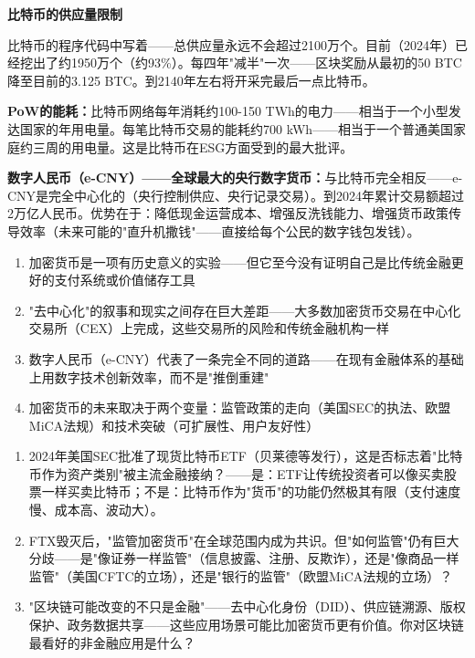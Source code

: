 \documentclass[a4paper,11pt]{ctexbook}
\begin{document}
\begin{quantitative}
\textbf{比特币的供应量限制}

比特币的程序代码中写着——总供应量永远不会超过2100万个。目前（2024年）已经挖出了约1950万个（约93\%）。每四年"减半"一次——区块奖励从最初的50 BTC降至目前的3.125 BTC。到2140年左右将开采完最后一点比特币。

\textbf{PoW的能耗：}比特币网络每年消耗约100-150 TWh的电力——相当于一个小型发达国家的年用电量。每笔比特币交易的能耗约700 kWh——相当于一个普通美国家庭约三周的用电量。这是比特币在ESG方面受到的最大批评。

\textbf{数字人民币（e-CNY）——全球最大的央行数字货币：}与比特币完全相反——e-CNY是完全中心化的（央行控制供应、央行记录交易）。到2024年累计交易额超过2万亿人民币。优势在于：降低现金运营成本、增强反洗钱能力、增强货币政策传导效率（未来可能的"直升机撒钱"——直接给每个公民的数字钱包发钱）。
\end{quantitative}

\begin{lessonsummary}
\begin{enumerate}
  \item 加密货币是一项有历史意义的实验——但它至今没有证明自己是比传统金融更好的支付系统或价值储存工具
  \item "去中心化"的叙事和现实之间存在巨大差距——大多数加密货币交易在中心化交易所（CEX）上完成，这些交易所的风险和传统金融机构一样
  \item 数字人民币（e-CNY）代表了一条完全不同的道路——在现有金融体系的基础上用数字技术创新效率，而不是"推倒重建"
  \item 加密货币的未来取决于两个变量：监管政策的走向（美国SEC的执法、欧盟MiCA法规）和技术突破（可扩展性、用户友好性）
\end{enumerate}
\end{lessonsummary}

\begin{discuss}
\begin{enumerate}
  \item 2024年美国SEC批准了现货比特币ETF（贝莱德等发行），这是否标志着"比特币作为资产类别"被主流金融接纳？——是：ETF让传统投资者可以像买卖股票一样买卖比特币；不是：比特币作为"货币"的功能仍然极其有限（支付速度慢、成本高、波动大）。
  \item FTX毁灭后，"监管加密货币"在全球范围内成为共识。但"如何监管"仍有巨大分歧——是"像证券一样监管"（信息披露、注册、反欺诈），还是"像商品一样监管"（美国CFTC的立场），还是"银行的监管"（欧盟MiCA法规的立场）？
  \item "区块链可能改变的不只是金融"——去中心化身份（DID）、供应链溯源、版权保护、政务数据共享——这些应用场景可能比加密货币更有价值。你对区块链最看好的非金融应用是什么？
\end{enumerate}
\end{discuss}
\end{document}
